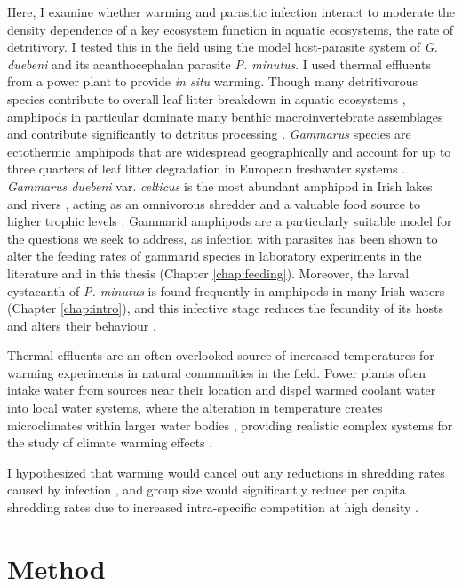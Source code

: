 Here, I examine whether warming and parasitic infection interact to moderate the density dependence of a key ecosystem function in aquatic ecosystems, the rate of detritivory. I tested this in the field using the model host-parasite system of \emph{G. duebeni} and its acanthocephalan parasite \emph{P. minutus}. I used thermal effluents from a power plant to provide \emph{in situ} warming. Though many detritivorous species contribute to overall leaf litter breakdown in aquatic ecosystems \citep{tonin2018}, amphipods in particular dominate many benthic macroinvertebrate assemblages and contribute significantly to detritus processing \citep{kenna2017, little2018}. \emph{Gammarus} species are ectothermic amphipods that are widespread geographically and account for up to three quarters of leaf litter degradation in European freshwater systems \citep{piscart2011}. \emph{Gammarus duebeni} var. \emph{celticus} is the most abundant amphipod in Irish lakes and rivers \citep{reid1938}, acting as an omnivorous shredder and a valuable food source to higher trophic levels \citep{kelly2002}. Gammarid amphipods are a particularly suitable model for the questions we seek to address, as infection with parasites has been shown to alter the feeding rates of gammarid species in laboratory experiments in the literature \citep{bunke2015, labaude2016, laverty2017} and in this thesis (Chapter \ref{chap:feeding}). Moreover, the larval cystacanth of \emph{P. minutus} is found frequently in amphipods in many Irish waters (Chapter \ref{chap:intro}), and this infective stage reduces the fecundity of its hosts and alters their behaviour \citep{bailly2017}. 

Thermal effluents are an often overlooked source of increased temperatures for warming experiments in natural communities in the field. Power plants often intake water from sources near their location and dispel warmed coolant water into local water systems, where the alteration in temperature creates microclimates within larger water bodies \citep{aho1982, hoglund1990}, providing realistic complex systems for the study of climate warming effects \citep{raptis2016}. 

I hypothesized that warming would cancel out any reductions in shredding rates caused by infection \citep{labaude2016}, and group size would significantly reduce per capita shredding rates due to increased intra-specific competition at high density \citep{vandervorste2017}.

\section{Method}

